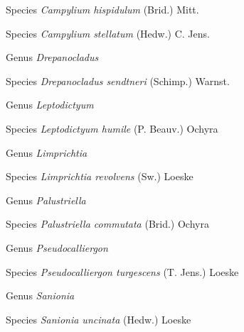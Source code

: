 \documentclass[9pt, article]{memoir}
\begin{document}
\begin{multicols}{2}
\vspace{6pt}\noindent\hspace{36pt}Species \textit{Campylium hispidulum} (Brid.) Mitt.


\vspace{6pt}\noindent\hspace{36pt}Species \textit{Campylium stellatum} (Hedw.) C. Jens.


\vspace{6pt}\noindent\hspace{30pt}Genus \textit{Drepanocladus}


\vspace{6pt}\noindent\hspace{36pt}Species \textit{Drepanocladus sendtneri} (Schimp.) Warnst.


\vspace{6pt}\noindent\hspace{30pt}Genus \textit{Leptodictyum}


\vspace{6pt}\noindent\hspace{36pt}Species \textit{Leptodictyum humile} (P. Beauv.) Ochyra


\vspace{6pt}\noindent\hspace{30pt}Genus \textit{Limprichtia}


\vspace{6pt}\noindent\hspace{36pt}Species \textit{Limprichtia revolvens} (Sw.) Loeske


\vspace{6pt}\noindent\hspace{30pt}Genus \textit{Palustriella}


\vspace{6pt}\noindent\hspace{36pt}Species \textit{Palustriella commutata} (Brid.) Ochyra


\vspace{6pt}\noindent\hspace{30pt}Genus \textit{Pseudocalliergon}


\vspace{6pt}\noindent\hspace{36pt}Species \textit{Pseudocalliergon turgescens} (T. Jens.) Loeske


\vspace{6pt}\noindent\hspace{30pt}Genus \textit{Sanionia}


\vspace{6pt}\noindent\hspace{36pt}Species \textit{Sanionia uncinata} (Hedw.) Loeske



\end{multicols}
\end{document}
